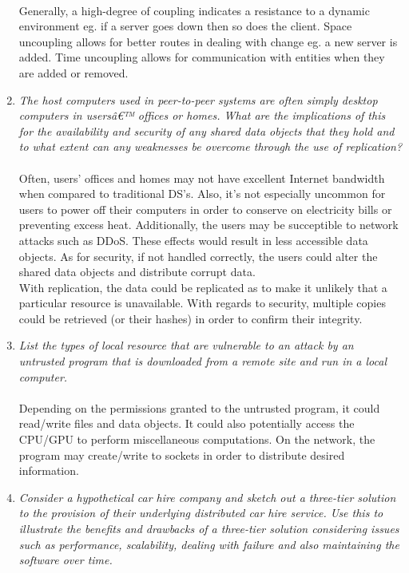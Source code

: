 \documentclass[11pt]{article}
\theoremstyle{plain}
\theoremstyle{definition}
\begin{document}
\begin{enumerate}
	\\
	Generally, a high-degree of coupling indicates a resistance to a dynamic environment eg. if a server goes down then so does the client. Space uncoupling allows for better routes in dealing with change eg. a new server is added. Time uncoupling allows for communication with entities when they are added or removed.
	\item \textit{The host computers used in peer-to-peer systems are often simply desktop computers in usersâ€™ offices or homes. What are the implications of this for the availability and security of any shared data objects that they hold and to what extent can any weaknesses be overcome through the use of replication?} \\
	\\
	Often, users' offices and homes may not have excellent Internet bandwidth when compared to traditional DS's. Also, it's not especially uncommon for users to power off their computers in order to conserve on electricity bills or preventing excess heat. Additionally, the users may be succeptible to network attacks such as DDoS. These effects would result in less accessible data objects. As for security, if not handled correctly, the users could alter the shared data objects and distribute corrupt data. \\
	With replication, the data could be replicated as to make it unlikely that a particular resource is unavailable. With regards to security, multiple copies could be retrieved (or their hashes) in order to confirm their integrity.
	\item \textit{List the types of local resource that are vulnerable to an attack by an untrusted program that is downloaded from a remote site and run in a local computer.} \\
	\\
	Depending on the permissions granted to the untrusted program, it could read/write files and data objects. It could also potentially access the CPU/GPU to perform miscellaneous computations. On the network, the program may create/write to sockets in order to distribute desired information.
	\item \textit{Consider a hypothetical car hire company and sketch out a three-tier solution to the provision of their underlying distributed car hire service. Use this to illustrate the benefits and drawbacks of a three-tier solution considering issues such as performance, scalability, dealing with failure and also maintaining the software over time.} \\

\end{enumerate}
\end{document}
